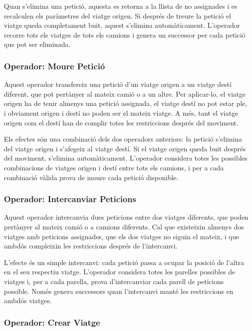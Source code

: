 Quan s'elimina una petició, aquesta es retorna a la llista de no assignades i es recalculen els paràmetres del viatge origen. Si després de treure la petició el viatge queda completament buit, aquest s'elimina automàticament. L'operador recorre tots els viatges de tots els camions i genera un successor per cada petició que pot ser eliminada. 

\subsubsection{Operador: Moure Petició}

Aquest operador transfereix una petició d'un viatge origen a un viatge destí diferent, que pot pertànyer al mateix camió o a un altre. Per aplicar-lo, el viatge origen ha de tenir almenys una petició assignada, el viatge destí no pot estar ple, i obviament origen i destí no poden ser el mateix viatge. A més, tant el viatge origen com el destí han de complir totes les restriccions després del moviment.

Els efectes són una combinació dels dos operadors anteriors: la petició s'elimina del viatge origen i s'afegeix al viatge destí. Si el viatge origen queda buit després del moviment, s'elimina automàticament. L'operador considera totes les possibles combinacions de viatges origen i destí entre tots els camions, i per a cada combinació vàlida prova de moure cada petició disponible.

\subsubsection{Operador: Intercanviar Peticions}

Aquest operador intercanvia dues peticions entre dos viatges diferents, que poden pertànyer al mateix camió o a camions diferents. Cal que existeixin almenys dos viatges amb peticions assignades, que els dos viatges no siguin el mateix, i que ambdós compleixin les restriccions després de l'intercanvi.

L'efecte és un simple intercanvi: cada petició passa a ocupar la posició de l'altra en el seu respectiu viatge. L'operador considera totes les parelles possibles de viatges i, per a cada parella, prova d'intercanviar cada parell de peticions possible. Només genera successors quan l'intercanvi manté les restriccions en ambdós viatges.

\subsubsection{Operador: Crear Viatge}

